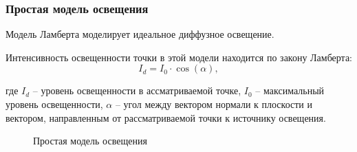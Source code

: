    	\subsubsection*{Простая модель освещения}
   	\par Модель Ламберта моделирует идеальное диффузное освещение.
   	\par Интенсивность освещенности точки в этой модели находится по закону Ламберта:
   	\begin{equation}\label{formula:Lambert}
		I_{d} = I_0 \cdot \cos{(\alpha)},
	\end{equation}
	\par где \begin{math}I_{d}\end{math} -- уровень освещенности в ассматриваемой точке, \begin{math}I_0\end{math} -- максимальный уровень освещенности, \begin{math}\alpha\end{math} -- угол между вектором нормали к плоскости и вектором, направленным от рассматриваемой точки к источнику освещения.
	\begin{figure}[h!]
		\caption{Простая модель освещения}
		\label{ris:image_l}
	\end{figure}

